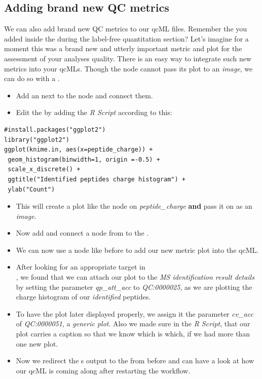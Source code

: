 \subsection{Adding brand new QC metrics}
\label{Adding brand new QC metrics}

We can also add brand new QC metrics to our qcML files. Remember the  you added inside the  during the label-free quantitation section? %
 Let's imagine for a moment this was a brand new and utterly important metric and plot for the assessment of your analyses quality. There is an easy way to integrate such new metrics into your qcMLs. Though the  node cannot pass its plot to an \textit{image}, we can do so with a . 

\begin{itemize}
\item Add an  next to the  node and connect them.
\item Edit the  by adding the \textit{R Script} according to this:
\end{itemize}
\begin{lstlisting}
#install.packages("ggplot2")
library("ggplot2")
ggplot(knime.in, aes(x=peptide_charge)) + 
 geom_histogram(binwidth=1, origin =-0.5) + 
 scale_x_discrete() + 
 ggtitle("Identified peptides charge histogram") + 
 ylab("Count")
\end{lstlisting}
\begin{itemize}
\item This will create a plot like the  node on \textit{peptide\_charge} \textbf{and} pass it on as an \textit{image}. 
\item Now add and connect a  node from  to the .
\item We can now use a  node like before to add our new metric plot into the qcML.
\item After looking for an appropriate target in \\ , we found that we can attach our plot to the \textit{MS identification result details} by setting the parameter \textit{qp\_att\_acc} to \textit{QC:0000025}, as we are plotting the charge histogram of our \textit{identified} peptides.
\item To have the plot later displayed properly, we assign it the parameter \textit{cv\_acc} of \textit{QC:0000051}, a \textit{generic plot}. Also we made sure in the \textit{R Script}, that our plot carries a caption so that we know which is which, if we had more than one new plot.
\item Now we redirect the s output to the  from before and can have a look at how our qcML is coming along after restarting the workflow.
\end{itemize}

